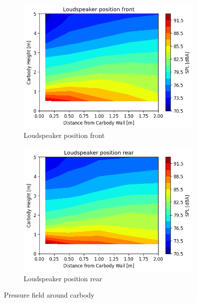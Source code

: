 \begin{figure}[H]
    \centering
     \begin{subfigure}[b]{0.49\textwidth}
        \centering
        \includegraphics[width=\textwidth]{fig/pressure_field_loudspeaker_front.png}
        \caption{Loudspeaker position front}
    \end{subfigure}
    \begin{subfigure}[b]{0.49\textwidth}
        \centering
        \includegraphics[width=\textwidth]{fig/pressure_field_loudspeaker_rear.png}
        \caption{Loudspeaker position rear}
    \end{subfigure}
        \caption{Pressure field around carbody}
        \label{fig:pressurefield}
\end{figure}

